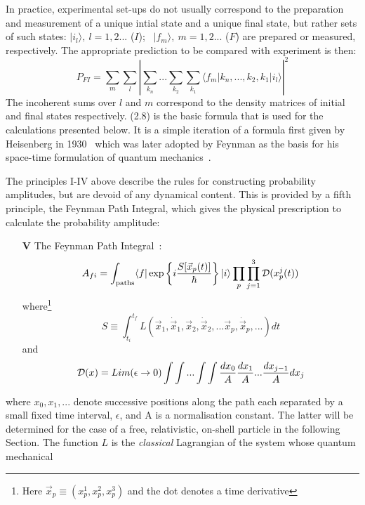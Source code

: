 {  \par In practice, experimental set-ups do not usually correspond to the preparation
   and measurement of a unique intial state and a unique final state, but rather sets of
    such states: $|i_l\rangle,~l =1,2...$ ($I$);~  $|f_m\rangle,~m =1,2...$ ($F$) are
   prepared or measured, respectively. The appropriate prediction to be compared with
   experiment is then:
   \begin{equation} 
      P_{FI} = \sum_m  \sum_l\left| \sum_{k_n}...\sum_{k_2}\sum_{k_1}
      \langle f_m|k_n,...,k_2,k_1|i_l \rangle\right|^2
    \end{equation}
  The incoherent sums over $l$  and $m$  correspond to the density matrices of 
   initial and final states respectively.
   (2.8) is the basic formula that is used for the calculations presented below. It is
    a simple iteration of a formula first given by Heisenberg in 1930~\cite{Heis1}
   which was later adopted by Feynman as the basis for his space-time formulation
   of quantum mechanics~\cite{Feyn5}.
     \par The principles I-IV above describe the rules for constructing probability
     amplitudes, but are devoid of any dynamical content. This is provided by a fifth
     principle, the Feynman Path Integral, which gives the physical prescription
    to calculate the probability amplitude:
  \begin{itemize}
  \item[{\bf V}]  The Feynman Path Integral~\cite{FPI}:
   \begin{equation}   
     A_{fi} = \int_{\rm paths} \langle f|\exp\left\{i \frac{S[\vec{x}_p(t)]}{\hbar}\right\}
     | i\rangle \prod_p \prod_{j=1}^3 {\cal D}(x_p^j(t))
    \end{equation}
     where\footnote{Here $\vec{x}_p \equiv (x_p^1,x_p^2,x_p^3)$
    and the dot denotes a time derivative} 
    \[ S \equiv \int_{t_i}^{t_f} L(\vec{x}_1, \dot{\vec{x}}_1,\vec{x}_2,\dot{\vec{x}}_2,...
   \vec{x}_p,\dot{\vec{x}}_p,...) dt \]
    and
    \[ {\cal D}(x) = Lim(\epsilon \rightarrow 0) \int \int ...\int \int\frac{dx_0}{A}
      \frac{dx_1}{A}... \frac{dx_{j-1}}{A} dx_j \]
    \end{itemize}
     where $x_0,x_1,...$ denote successive positions along the
     path each separated by a small fixed time interval, $\epsilon$,  and  A is a normalisation constant.
     The latter will be determined for the case of a 
      free, relativistic, on-shell particle in the following Section. 
     The function $L$ is the {\it classical} Lagrangian of the system whose quantum mechanical
}
